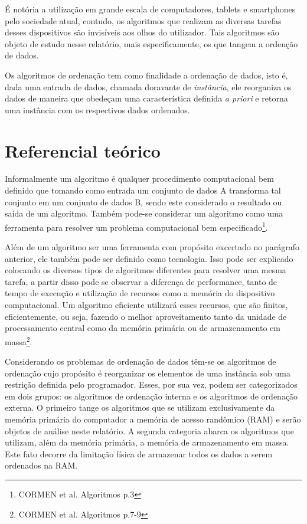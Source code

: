 \documentclass[a4paper, 12pt]{report}
\begin{document}
É notória a utilização em grande escala de computadores, tablets e smartphones
pelo sociedade atual, contudo, os algoritmos que realizam as diversas tarefas
desses dispositivos são invisíveis aos olhos do utilizador. Tais algoritmos são
objeto de estudo nesse relatório, mais especificamente, os que tangem a
ordenção de dados.

Os algoritmos de ordenação tem como finalidade a ordenação de dados, isto é,
dada uma entrada de dados, chamada doravante de \emph{instância}, ele reorganiza os
dados de maneira que obedeçam uma característica definida \emph{a priori} e retorna
uma instância com os respectivos dados ordenados.

\part{Referencial teórico}
\label{sec-2}
Informalmente um algoritmo é qualquer procedimento computacional bem definido
que tomando como entrada um conjunto de dados A transforma tal conjunto em
um conjunto de dados B, sendo este considerado o resultado ou saída de um
algoritmo. Também pode-se considerar um algoritmo como uma ferramenta para
resolver um problema computacional bem especificado\footnote{CORMEN et al. Algoritmos p.3}.

Além de um algoritmo ser uma ferramenta com propósito excertado no parágrafo
anterior, ele também pode ser definido como tecnologia. Isso pode ser explicado
colocando os diversos tipos de algoritmos diferentes para resolver uma mesma
tarefa, a partir disso pode se observar a diferença de performance, tanto de
tempo de execução e utilização de recursos como a memória do dispositivo
computacional. Um algoritmo eficiente utilizará esses recursos, que são
finitos, eficientemente, ou seja, fazendo o melhor aproveitamento tanto da
unidade de processamento central como da memória primária ou de armazenamento
em massa\footnote{CORMEN et al. Algoritmos p.7-9}.

Considerando os problemas de ordenação de dados têm-se os algoritmos de
ordenação cujo propósito é reorganizar os elementos de uma instância sob uma
restrição definida pelo programador. Esses, por sua vez, podem ser
categorizados em dois grupos: os algoritmos de ordenação interna e os
algoritmos de ordenação externa. O primeiro tange os algoritmos que se utilizam
exclusivamente da memória primária do computador a memória de acesso randômico
(RAM) e serão objetos de análise neste relatório. A segunda categoria abarca os
algoritmos que utilizam, além da memória primária, a memória de armazenamento
em massa. Este fato decorre da limitação física de armazenar todos os dados a
serem ordenados na RAM.
\end{document}
